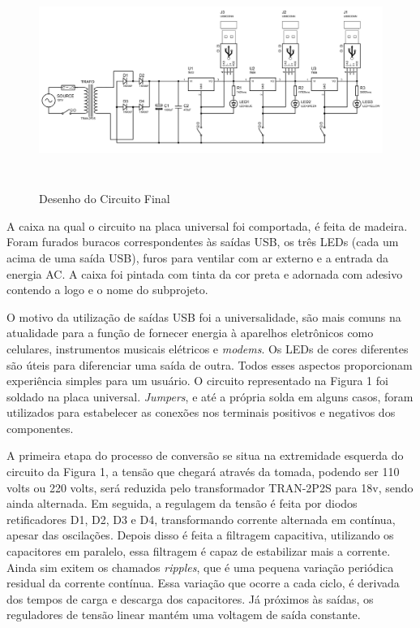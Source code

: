 
\begin{figure}[h]
    \includegraphics[height=7cm]{circuit-sketch}
    \caption{Desenho do Circuito Final}
    \label{fig:my_label}
\end{figure}

\par
A caixa na qual o circuito na placa universal foi comportada, é feita de madeira. Foram furados buracos correspondentes às saídas USB, os três LEDs (cada um acima de uma saída USB), furos para ventilar com ar externo e a entrada da energia AC. A caixa foi pintada com tinta da cor preta e adornada com adesivo contendo a logo e o nome do subprojeto.
\par
O motivo da utilização de saídas USB foi a universalidade, são mais comuns na atualidade para a função de fornecer energia à aparelhos eletrônicos como celulares, instrumentos musicais elétricos e \textit{modems}. Os LEDs de cores diferentes são úteis para diferenciar uma saída de outra. Todos esses aspectos proporcionam experiência simples para um usuário. O circuito representado na Figura 1 foi soldado na placa universal. \textit{Jumpers}, e até a própria solda em alguns casos, foram utilizados para estabelecer as conexões nos terminais positivos e negativos dos componentes.
\par
A primeira etapa do processo de conversão se situa na extremidade esquerda do circuito da Figura 1, a tensão que chegará através da tomada, podendo ser 110 volts ou 220 volts, será reduzida pelo transformador TRAN-2P2S para 18v, sendo ainda alternada. Em seguida, a regulagem da tensão é feita por diodos retificadores D1, D2, D3 e D4, transformando corrente alternada em contínua, apesar das oscilações. Depois disso é feita a filtragem capacitiva, utilizando os capacitores em paralelo, essa filtragem é capaz de estabilizar mais a corrente. Ainda sim exitem os chamados \textit{ripples}, que é uma pequena variação periódica residual da corrente contínua. Essa variação que ocorre a cada ciclo, é derivada dos tempos de carga e descarga dos capacitores. Já próximos às saídas, os reguladores de tensão linear mantém uma voltagem de saída constante.